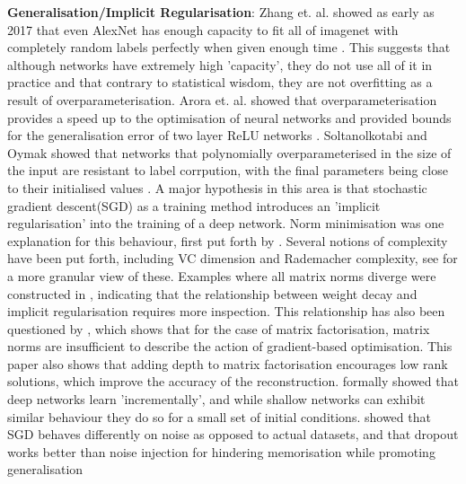 \documentclass{article}
\begin{document}
            \indent \textbf{Generalisation/Implicit Regularisation}: Zhang et. al. showed as early as 2017 that even AlexNet has enough capacity to fit all of imagenet with completely random labels perfectly when given enough time \cite{zhang2017understandingdeeplearningrequires}. This suggests that although networks have extremely high 'capacity', they do not use all of it in practice and that contrary to statistical wisdom, they are not overfitting as a result of overparameterisation. Arora et. al. showed that overparameterisation provides a speed up to the optimisation of neural networks and provided bounds for the generalisation error of two layer ReLU networks \cite{pmlr-v80-arora18a}. Soltanolkotabi and Oymak showed that networks that polynomially overparameterised in the size of the input are resistant to label corrpution, with the final parameters being close to their initialised values \cite{pmlr-v108-li20j}. A major hypothesis in this area is that stochastic gradient descent(SGD) as a training method introduces an 'implicit regularisation' into the training of a deep network. Norm minimisation was one explanation for this behaviour, first put forth by \cite{neyshabur2015searchrealinductivebias}. Several notions of complexity have been put forth, including VC dimension and Rademacher complexity, see \cite{neyshabur2017implicitregularizationdeeplearning} for a more granular view of these. Examples where all matrix norms diverge were constructed in \cite{razin2020implicitregularizationdeeplearning}, indicating that the relationship between weight decay and implicit regularisation requires more inspection. This relationship has also been questioned by \cite{arora2019implicitregularizationdeepmatrix}, which shows that for the case of matrix factorisation, matrix norms are insufficient to describe the action of gradient-based optimisation. This paper also shows that adding depth to matrix factorisation encourages low rank solutions, which improve the accuracy of the reconstruction. \cite{gissin2019implicitbiasdepthincremental} formally showed that deep networks learn 'incrementally', and while shallow networks can exhibit similar behaviour they do so for a small set of initial conditions. \cite{arpit2017closerlookmemorizationdeep} showed that SGD behaves differently on noise as opposed to actual datasets, and that dropout works better than noise injection for hindering memorisation while promoting generalisation
\end{document}
